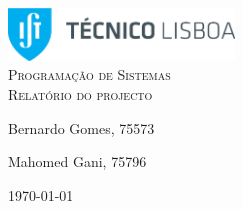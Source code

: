 \begin{titlepage}

	\begin{center}

		\includegraphics[width=6cm]{./title}\\[3cm]

		\textsc{\LARGE Programação de Sistemas}\\[1.5cm]

		\textsc{\Large Relatório do projecto}\\[1.5cm]


		


		\noindent
		\begin{minipage}{0.4\textwidth}
			\begin{flushleft} \large
				Bernardo Gomes, 75573
			\end{flushleft}
		\end{minipage}
		\begin{minipage}{0.4\textwidth}
			\begin{flushright} \large
				Mahomed Gani, 75796
			\end{flushright}
		\end{minipage}

		\vfill

		{\large \today}


	\end{center}

\end{titlepage}
